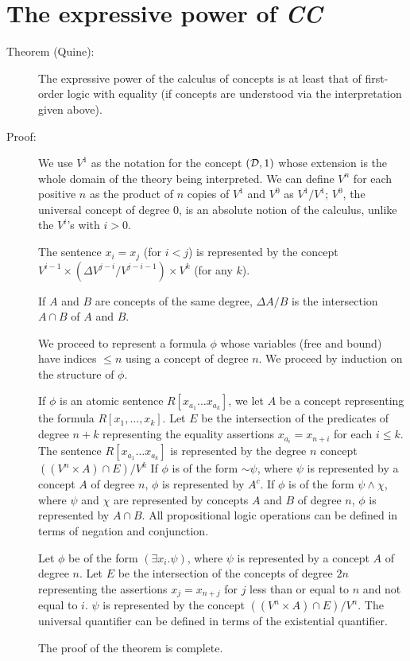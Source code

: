 \section{The expressive power of {\em CC\/}}
\begin{description}

\item[Theorem (Quine):] The expressive power of the calculus of
concepts is at least that of first-order logic with equality (if
concepts are understood via the interpretation given above).

\item[Proof:]  We use $V^1$ as the notation for the concept $({\cal D},1)$ 
whose extension is the whole domain of the theory being interpreted.
We can define $V^n$ for each positive $n$ as the product of $n$ copies
of $V^1$ and $V^0$ as $V^1/V^1$; $V^0$, the universal concept of
degree 0, is an absolute notion of the calculus, unlike the $V^i$'s
with $i>0$.

The sentence $x_i = x_j$ (for $i < j$) is represented by the concept
$V^{i-1}\times (\Delta V^{j-i} / V^{j-i-1})\times V^k$ (for any $k$).

If $A$ and $B$ are concepts of the same degree, $\Delta A / B$ is the
intersection $A \cap B$ of $A$ and $B$.

We proceed to represent a formula $\phi$ whose variables (free and
bound) have indices $\leq n$ using a concept of degree $n$.  We
proceed by induction on the structure of $\phi$.

If $\phi$ is an atomic sentence $R[x_{a_1}\ldots x_{a_k}]$, we let $A$
be a concept representing the formula $R[x_1,\ldots,x_k]$.  Let $E$ be the
intersection of the predicates of degree $n+k$ representing the
equality assertions $x_{a_i}=x_{n+i}$ for each $i \leq k$.  The
sentence $R[x_{a_1}\ldots x_{a_k}]$ is represented by the degree $n$
concept $((V^n \times A) \cap E)/V^{k}$
If $\phi$ is of the form $\sim\psi$, where $\psi$ is represented by a
concept $A$ of degree $n$, $\phi$ is represented by $A^c$.  If $\phi$
is of the form $\psi \wedge \chi$, where $\psi$ and $\chi$ are
represented by concepts $A$ and $B$ of degree $n$, $\phi$ is
represented by $A \cap B$.  All propositional logic operations can be
defined in terms of negation and conjunction.

Let $\phi$ be of the form $(\exists x_i.\psi)$, where $\psi$ is
represented by a concept $A$ of degree $n$.  Let $E$ be the
intersection of the concepts of degree $2n$ representing the assertions
$x_j = x_{n+j}$ for $j$ less than or equal to $n$ and not equal to
$i$.  $\psi$ is represented by the concept $((V^n\times A)\cap E)/V^n$.
The universal quantifier can be defined in terms of the existential
quantifier.

The proof of the theorem is complete.

\end{description}


